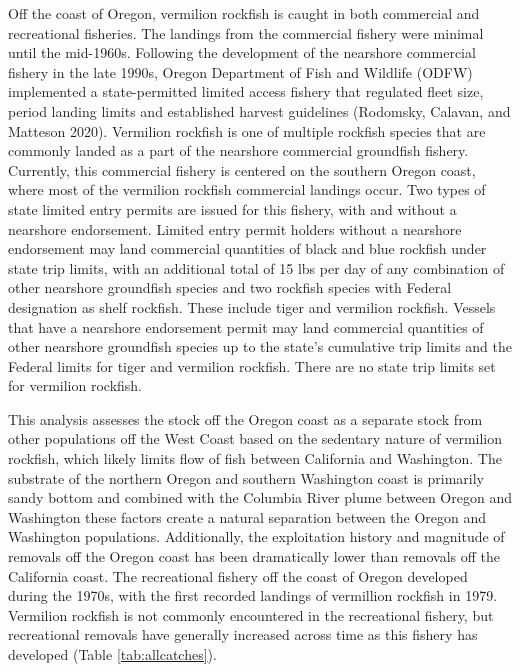 \documentclass[11pt,
  english,
  a4paper,
]{article}
\begin{document}

Off the coast of Oregon, vermilion rockfish is caught in both commercial and recreational fisheries. The landings from the commercial fishery were minimal until the mid-1960s. Following the development of the nearshore commercial fishery in the late 1990s, Oregon Department of Fish and Wildlife (ODFW) implemented a state-permitted limited access fishery that regulated fleet size, period landing limits and established harvest guidelines {(Rodomsky, Calavan, and Matteson 2020)\leavevmode\tagmcend\tagstructend}. Vermilion rockfish is one of multiple rockfish species that are commonly landed as a part of the nearshore commercial groundfish fishery. Currently, this commercial fishery is centered on the southern Oregon coast, where most of the vermilion rockfish commercial landings occur. Two types of state limited entry permits are issued for this fishery, with and without a nearshore endorsement. Limited entry permit holders without a nearshore endorsement may land commercial quantities of black and blue rockfish under state trip limits, with an additional total of 15 lbs per day of any combination of other nearshore groundfish species and two rockfish species with Federal designation as shelf rockfish. These include tiger and vermilion rockfish. Vessels that have a nearshore endorsement permit may land commercial quantities of other nearshore groundfish species up to the state's cumulative trip limits and the Federal limits for tiger and vermilion rockfish. There are no state trip limits set for vermilion rockfish.

\leavevmode\tagmcend\tagstructend\par


This analysis assesses the stock off the Oregon coast as a separate stock from other populations off the West Coast based on the sedentary nature of vermilion rockfish, which likely limits flow of fish between California and Washington. The substrate of the northern Oregon and southern Washington coast is primarily sandy bottom and combined with the Columbia River plume between Oregon and Washington these factors create a natural separation between the Oregon and Washington populations. Additionally, the exploitation history and magnitude of removals off the Oregon coast has been dramatically lower than removals off the California coast. The recreational fishery off the coast of Oregon developed during the 1970s, with the first recorded landings of vermillion rockfish in 1979. Vermilion rockfish is not commonly encountered in the recreational fishery, but recreational removals have generally increased across time as this fishery has developed (Table \ref{tab:allcatches}).
\end{document}
